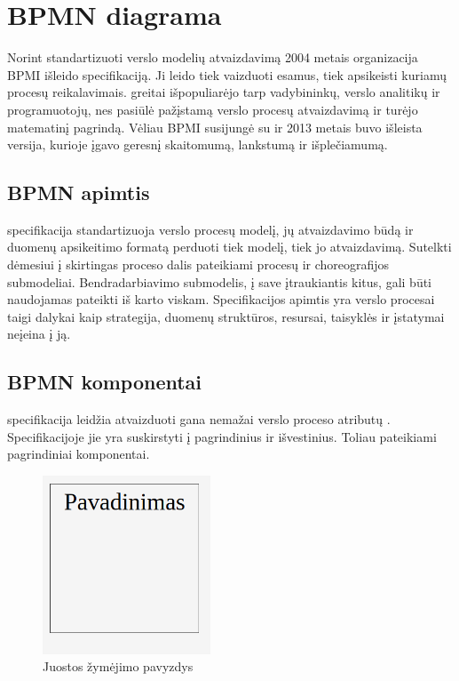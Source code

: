 \section{BPMN diagrama} \label{section:bpmn}
Norint standartizuoti verslo modelių atvaizdavimą 2004 metais organizacija BPMI išleido  specifikaciją. Ji leido tiek vaizduoti esamus, tiek apsikeisti kuriamų procesų reikalavimais. \BPMN greitai išpopuliarėjo tarp vadybininkų, verslo analitikų ir programuotojų, nes pasiūlė pažįstamą verslo procesų atvaizdavimą ir turėjo matematinį pagrindą. Vėliau BPMI susijungė su \OMG ir 2013 metais buvo išleista  versija, kurioje \BPMN įgavo geresnį skaitomumą, lankstumą ir išplečiamumą.

\subsection{BPMN apimtis}
\BPMN specifikacija standartizuoja verslo procesų modelį, jų atvaizdavimo būdą ir duomenų apsikeitimo formatą perduoti tiek modelį, tiek jo atvaizdavimą. Sutelkti dėmesiui į skirtingas proceso dalis pateikiami procesų ir choreografijos submodeliai. Bendradarbiavimo submodelis, į save įtraukiantis kitus, gali būti naudojamas pateikti iš karto viskam. Specifikacijos apimtis yra verslo procesai taigi dalykai kaip strategija, duomenų struktūros, resursai, taisyklės ir įstatymai neįeina į ją. 
 
\subsection{BPMN komponentai} \label{section:bpmn_components}
\BPMN specifikacija leidžia atvaizduoti gana nemažai verslo proceso atributų \cite{bpmnFormal}. Specifikacijoje jie yra suskirstyti į pagrindinius ir išvestinius. Toliau pateikiami pagrindiniai \BPMN komponentai.

\begin{figure}[H]
	\centering
	\includegraphics[width=5cm]{img/bpm-components/pool}
	\caption{Juostos žymėjimo pavyzdys}
	\label{img:bpm_components_pool}
\end{figure}

